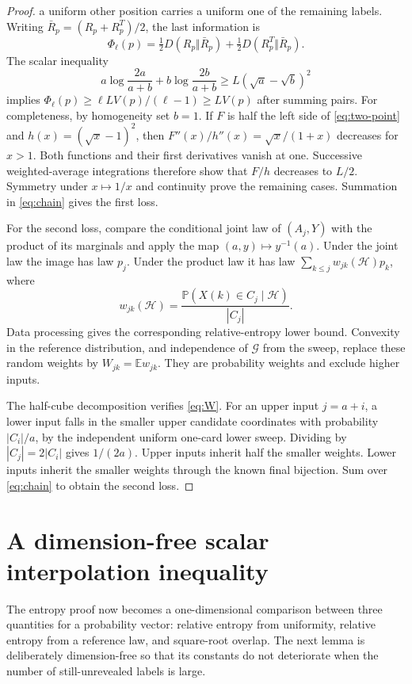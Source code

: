 \documentclass[11pt]{article}
\numberwithin{equation}{section}
\theoremstyle{definition}\newtheorem{definition}[theorem]{Definition}
\theoremstyle{remark}\newtheorem{remark}[theorem]{Remark}
\newcommand{\E}{\mathbb E}
\newcommand{\Prb}{\mathbb P}
\begin{document}
\begin{proof}
a uniform other position carries a uniform one of the remaining labels.
Writing $\bar R_p=(R_p+R_p^T)/2$, the last information is
\[
 \Phi_\ell(p)=\tfrac12D(R_p\Vert\bar R_p)
              +\tfrac12D(R_p^T\Vert\bar R_p).
\]
The scalar inequality
\begin{equation}\label{eq:two-point}
 a\log\frac{2a}{a+b}+b\log\frac{2b}{a+b}
 \ge L(\sqrt a-\sqrt b)^2
\end{equation}
implies
$\Phi_\ell(p)\ge \ell L V(p)/(\ell-1)\ge LV(p)$ after summing pairs.
For completeness, by homogeneity set $b=1$. If $F$ is half the left side
of \eqref{eq:two-point} and $h(x)=(\sqrt x-1)^2$, then
$F''(x)/h''(x)=\sqrt x/(1+x)$ decreases for $x>1$. Both functions and their
first derivatives vanish at one. Successive weighted-average integrations
therefore show that $F/h$ decreases to $L/2$. Symmetry under $x\mapsto1/x$
and continuity prove the remaining cases. Summation in \eqref{eq:chain}
gives the first loss.

For the second loss, compare the conditional joint law of $(A_j,Y)$ with
the product of its marginals and apply the map $(a,y)\mapsto y^{-1}(a)$.
Under the joint law the image has law $p_j$. Under the product law it has
law $\sum_{k\le j}w_{jk}(\mathcal H)p_k$, where
\[
 w_{jk}(\mathcal H)=
 \frac{\Prb(X(k)\in C_j\mid\mathcal H)}{|C_j|}.
\]
Data processing gives the corresponding relative-entropy lower bound.
Convexity in the reference distribution, and independence of $\mathcal G$
from the sweep, replace these random weights by
$W_{jk}=\E w_{jk}$. They are probability weights and exclude higher inputs.

The half-cube decomposition verifies \eqref{eq:W}. For an upper input
$j=a+i$, a lower input falls in the smaller upper candidate coordinates
with probability $|C_i|/a$, by the independent uniform one-card lower
sweep. Dividing by $|C_j|=2|C_i|$ gives $1/(2a)$. Upper inputs inherit half
the smaller weights. Lower inputs inherit the smaller weights through the
known final bijection. Sum over \eqref{eq:chain} to obtain the second loss.
\end{proof}

\section{A dimension-free scalar interpolation inequality}
\label{sec:scalar}
The entropy proof now becomes a one-dimensional comparison between three
quantities for a probability vector: relative entropy from uniformity,
relative entropy from a reference law, and square-root overlap.  The next
lemma is deliberately dimension-free so that its constants do not deteriorate
when the number of still-unrevealed labels is large.
\end{document}
